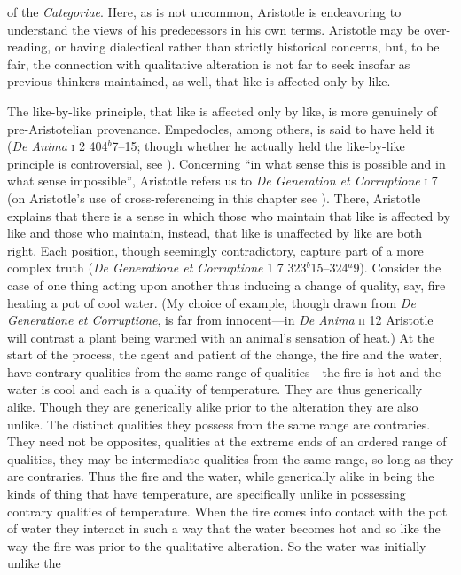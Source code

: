 of the \emph{Categoriae}. Here, as is not uncommon, Aristotle is endeavoring to understand the views of his predecessors in his own terms. Aristotle may be over-reading, or having dialectical rather than strictly historical concerns, but, to be fair, the connection with qualitative alteration is not far to seek insofar as previous thinkers maintained, as well, that like is affected only by like.

The like-by-like principle, that like is affected only by like, is more genuinely of pre-Aristotelian provenance. Empedocles, among others, is said to have held it (\emph{De Anima} \textsc{i} 2 404\( ^{b} \)7--15; though whether he actually held the like-by-like principle is controversial, see \citealt{Kamtekar:2009fk}). Concerning ``in what sense this is possible and in what sense impossible'', Aristotle refers us to \emph{De Generation et Corruptione} \textsc{i} 7 (on Aristotle's use of cross-referencing in this chapter see \citealt{Burnyeat:2002an}). There, Aristotle explains that there is a sense in which those who maintain that like is affected by like and those who maintain, instead, that like is unaffected by like are both right. Each position, though seemingly contradictory, capture part of a more complex truth (\emph{De Generatione et Corruptione} \textsc{1} 7 323\( ^{b} \)15--324\( ^{a} \)9). Consider the case of one thing acting upon another thus inducing a change of quality, say, fire heating a pot of cool water. (My choice of example, though drawn from \emph{De Generatione et Corruptione}, is far from innocent---in \emph{De Anima} \textsc{ii} 12 Aristotle will contrast a plant being warmed with an animal's sensation of heat.) At the start of the process, the agent and patient of the change, the fire and the water, have contrary qualities from the same range of qualities---the fire is hot and the water is cool and each is a quality of temperature. They are thus generically alike. Though they are generically alike prior to the alteration they are also unlike. The distinct qualities they possess from the same range are contraries. They need not be opposites, qualities at the extreme ends of an ordered range of qualities, they may be intermediate qualities from the same range, so long as they are contraries. Thus the fire and the water, while generically alike in being the kinds of thing that have temperature, are specifically unlike in possessing contrary qualities of temperature. When the fire comes into contact with the pot of water they interact in such a way that the water becomes hot and so like the way the fire was prior to the qualitative alteration. So the water was initially unlike the 